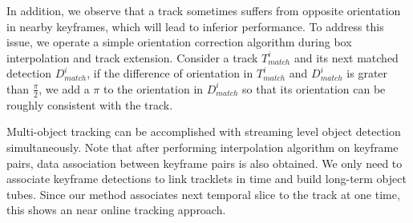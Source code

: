 \documentclass[a4paper, 10pt, conference]{ieeeconf}      %
\def\figurename{\emph{Figure}}
\begin{document}
In addition, we observe that a track sometimes suffers from opposite orientation in nearby keyframes, which will lead to inferior performance. To address this issue, we operate a simple orientation correction algorithm during box interpolation and track extension. Consider a track $T^i_{match}$ and its next matched detection $D^i_{match}$, if the difference of orientation in $T^i_{match}$ and $D^i_{match}$ is grater than $\frac{\pi}{2}$, we add a $\pi$ to the orientation in $D^i_{match}$ so that its orientation can be roughly consistent with the track. 

Multi-object tracking can be accomplished with streaming level object detection simultaneously. Note that after performing interpolation algorithm on keyframe pairs, data association between keyframe pairs is also obtained. We only need to associate keyframe detections to link tracklets in time and build long-term object tubes. Since our method associates next temporal slice to the track at one time, this shows an near online tracking approach.

\end{document}
